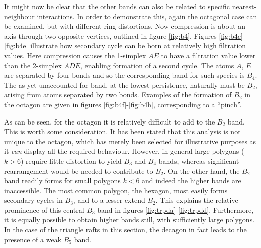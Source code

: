 It might now be clear that the other bands can also be related to specific nearest\--neighbour interactions.
In order to demonstrate this, again the octagonal case can be examined, but with different ring distortions.
Now compression is about an axis through two opposite vertices, outlined in figure \ref{fig:b4}.
Figures \ref{fig:b4c}\--\ref{fig:b4e} illustrate how secondary cycle can be born at relatively high filtration values.
Here compression causes the 1\--simplex $AE$ to have a filtration value lower than the 2\--simplex $ADE$, enabling formation of a second cycle.
The atoms $A$, $E$ are separated by four bonds and so the corresponding band for such species is $B_4$.
The as\--yet unaccounted for band, at the lowest persistence, naturally must be $B_2$, arising from atoms separated by two bonds.
Examples of the formation of $B_2$ in the octagon are given in figures \ref{fig:b4f}\--\ref{fig:b4h}, corresponding to a ``pinch''.

As can be seen, for the octagon it is relatively difficult to add to the $B_2$ band.
This is worth some consideration. 
It has been stated that this analysis is not unique to the octagon, which has merely been selected for illustrative purposes as it \textit{can} display all the required behaviour.
However, in general large polygons ($k>6$) require little distortion to yield $B_3$ and $B_4$ bands, whereas significant rearrangement would be needed to contribute to $B_2$.
On the other hand, the $B_2$ band readily forms for small polygons $k<6$ and indeed the higher bands are inaccessible.
The most common polygon, the hexagon, most easily forms secondary cycles in $B_3$, and to a lesser extend $B_2$. 
This explains the relative prominence of this central $B_3$ band in figures \ref{fig:trpda}\--\ref{fig:trpdd}.
Furthermore, it is equally possible to obtain higher bands still, with sufficiently large polygons.
In the case of the triangle rafts in this section, the decagon in fact leads to the presence of a weak $B_5$ band.

